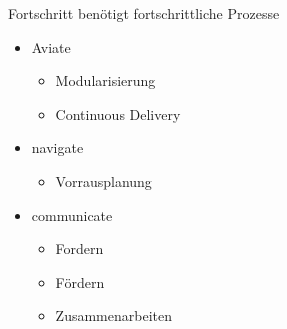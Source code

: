 

\begin{frame}[light]{Fortschritt benötigt fortschrittliche Prozesse}
  \begin{itemize}
    \item Aviate %
    \begin{itemize}
      \item Modularisierung
      \item Continuous Delivery
    \end{itemize}
    \item navigate %
    \begin{itemize}
      \item Vorrausplanung
    \end{itemize}
    \item communicate %
    \begin{itemize}
      \item Fordern
      \item Fördern
      \item Zusammenarbeiten
    \end{itemize}
  \end{itemize}
\end{frame}



